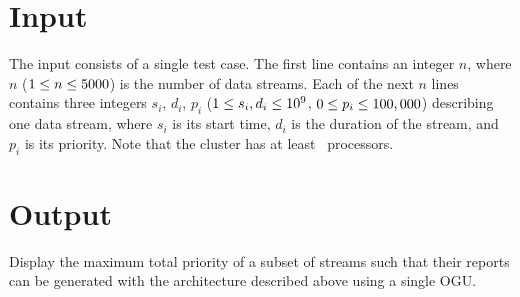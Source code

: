 \section*{Input}
The input consists of a single test case. The first line contains an integer $n$, where $n$ ($1 \le n \le 5000$) is the number of data streams. Each of the next $n$ lines contains three integers $s_i$, $d_i$, $p_i$ ($1 \le s_i,d_i \le 10^9$, $0 \le p_i \le 100,000$) describing one data stream, where $s_i$ is its start time, $d_i$ is the duration of the stream, and $p_i$ is its priority. Note that the cluster has at least \maxstreams\ processors.

\section*{Output}
Display the maximum total priority of a subset of streams such that their reports can be generated with the architecture described above using a single OGU.
